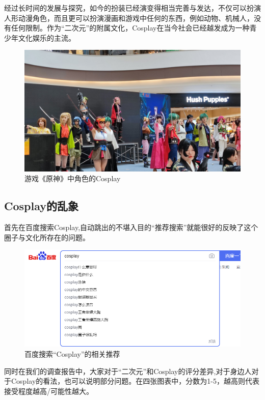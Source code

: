 \documentclass[a4paper]{article}
\begin{document}
	经过长时间的发展与探究，如今的扮装已经演变得相当完善与发达，不仅可以扮演人形动漫角色，而且更可以扮演漫画和游戏中任何的东西，例如动物、机械人，没有任何限制。作为“二次元”的附属文化，Cosplay在当今社会已经越发成为一种青少年文化娱乐的主流。
	\begin{figure}[H]
		\centering
		\includegraphics[width=0.5\linewidth]{figures/9}
		\caption*{游戏《原神》中角色的Cosplay}
	\end{figure}
	
	\subsection{Cosplay的乱象}
	首先在百度搜索Cosplay,自动跳出的不堪入目的“推荐搜索”就能很好的反映了这个圈子与文化所存在的问题。\\
	\begin{figure}[H]
		\centering
		\includegraphics[width=0.5\linewidth]{figures/2}
		\caption*{百度搜索“Cosplay”的相关推荐}
	\end{figure}
	
	同时在我们的调查报告中，大家对于“二次元”和Cosplay的评分差异,对于身边人对于Cosplay的看法，也可以说明部分问题。在四张图表中，分数为1-5，越高则代表接受程度越高/可能性越大。\\
	
\end{document}
